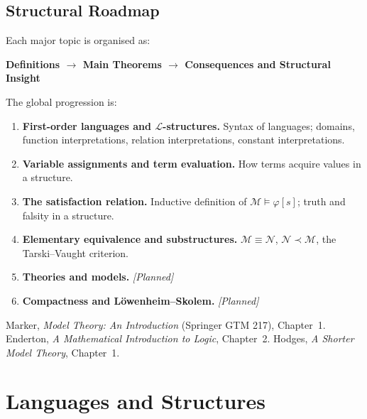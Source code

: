 
\subsection*{Structural Roadmap}

Each major topic is organised as:
\begin{center}
\textbf{Definitions $\longrightarrow$ Main Theorems
$\longrightarrow$ Consequences and Structural Insight}
\end{center}

The global progression is:
\begin{enumerate}
  \item \textbf{First-order languages and $\mathcal{L}$-structures.}
        Syntax of languages; domains, function interpretations, relation
        interpretations, constant interpretations.
  \item \textbf{Variable assignments and term evaluation.}
        How terms acquire values in a structure.
  \item \textbf{The satisfaction relation.}
        Inductive definition of $\mathcal{M} \models \varphi[s]$;
        truth and falsity in a structure.
  \item \textbf{Elementary equivalence and substructures.}
        $\mathcal{M} \equiv \mathcal{N}$, $\mathcal{N} \prec \mathcal{M}$,
        the Tarski--Vaught criterion.
  \item \textbf{Theories and models.} \textit{[Planned]}
  \item \textbf{Compactness and L\"{o}wenheim--Skolem.} \textit{[Planned]}
\end{enumerate}

\begin{remark}
Marker, \textit{Model Theory: An Introduction} (Springer GTM 217),
Chapter~1. Enderton, \textit{A Mathematical Introduction to Logic},
Chapter~2. Hodges, \textit{A Shorter Model Theory}, Chapter~1.
\end{remark}


\section{Languages and Structures}

